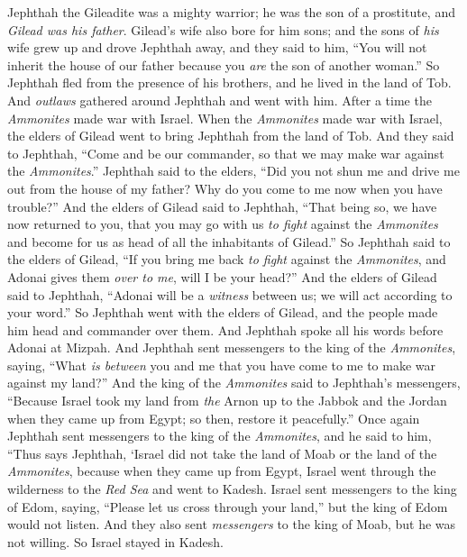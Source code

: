 \begin{biblechapter} %
 Jephthah the Gileadite was a mighty warrior; he was the son of a prostitute, and \textit{Gilead was his father}.
\verse Gilead’s wife also bore for him sons; and the sons of \textit{his} wife grew up and drove Jephthah away, and they said to him, “You will not inherit the house of our father because you \textit{are} the son of another woman.”
\verse So Jephthah fled from the presence of his brothers, and he lived in the land of Tob. And \textit{outlaws} gathered around Jephthah and went with him.
\verse After a time the \textit{Ammonites} made war with Israel.
\verse When the \textit{Ammonites} made war with Israel, the elders of Gilead went to bring Jephthah from the land of Tob.
\verse And they said to Jephthah, “Come and be our commander, so that we may make war against the \textit{Ammonites}.”
\verse Jephthah said to the elders, “Did you not shun me and drive me out from the house of my father? Why do you come to me now when you have trouble?”
\verse And the elders of Gilead said to Jephthah, “That being so, we have now returned to you, that you may go with us \textit{to fight} against the \textit{Ammonites} and become for us as head of all the inhabitants of Gilead.”
\verse So Jephthah said to the elders of Gilead, “If you bring me back \textit{to fight} against the \textit{Ammonites}, and Adonai gives them \textit{over to me}, will I be your head?”
\verse And the elders of Gilead said to Jephthah, “Adonai will be a \textit{witness} between us; we will act according to your word.”
\verse So Jephthah went with the elders of Gilead, and the people made him head and commander over them. And Jephthah spoke all his words before Adonai at Mizpah.
\verse And Jephthah sent messengers to the king of the \textit{Ammonites}, saying, “What \textit{is between} you and me that you have come to me to make war against my land?”
\verse And the king of the \textit{Ammonites} said to Jephthah’s messengers, “Because Israel took my land from \textit{the} Arnon up to the Jabbok and the Jordan when they came up from Egypt; so then, restore it peacefully.”
\verse Once again Jephthah sent messengers to the king of the \textit{Ammonites},
\verse and he said to him, “Thus says Jephthah, ‘Israel did not take the land of Moab or the land of the \textit{Ammonites},
\verse because when they came up from Egypt, Israel went through the wilderness to the \textit{Red Sea} and went to Kadesh.
\verse Israel sent messengers to the king of Edom, saying, “Please let us cross through your land,” but the king of Edom would not listen. And they also sent \textit{messengers} to the king of Moab, but he was not willing. So Israel stayed in Kadesh.

\end{biblechapter}
